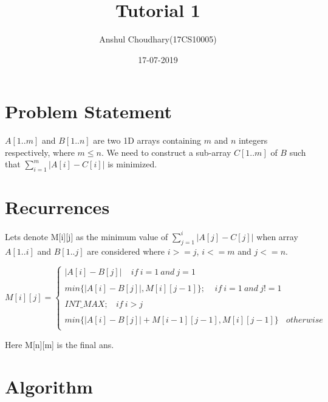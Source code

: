 \documentclass{article}
\title{Tutorial 1}
\date{17-07-2019}
\author{Anshul Choudhary(17CS10005)}
\begin{document}
  \maketitle
  
  \section{Problem Statement}
    $A[1..m]$ and $B[1..n]$ are two 1D arrays containing $m$ and $n$ integers 
    respectively, where $m\le n$.
    We need to construct a sub-array $C[1..m]$ of $B$ such that 
    $\sum\limits_{i=1}^{m} \big|A[i]-C[i]\big|$ is minimized.
  
  \section{Recurrences}
  
    Lets denote M[i][j] as the minimum value of   $\sum\limits_{j=1}^{i} \big|A[j]-C[j]\big|$ when array $A[1..i]$ and $B[1..j]$ are considered where $i >= j$, $i <= m$ and $j <= n$.
    
      \begin{equation*}
        M[i][j]=\begin{cases}
		   |A[i] - B[j]|\ \ \ \ \ if\ i = 1\ and\ j = 1 \\
			\\
                   min\{ |A[i] - B[j] |  ,  M[i][j-1] \};\ \ \ \ \ if\ i = 1\ and\ j != 1\\
			\\
                   INT\_MAX;\ \ \ \ if\ i > j\\
			\\
                   min\{ |A[i] - B[j] | + M[i-1][j-1]  ,  M[i][j-1] \}\ \ \ \ otherwise \\
                \end{cases}
        \end{equation*}

Here M[n][m] is the final ans.
  
  \section{Algorithm}
  
\end{document}
